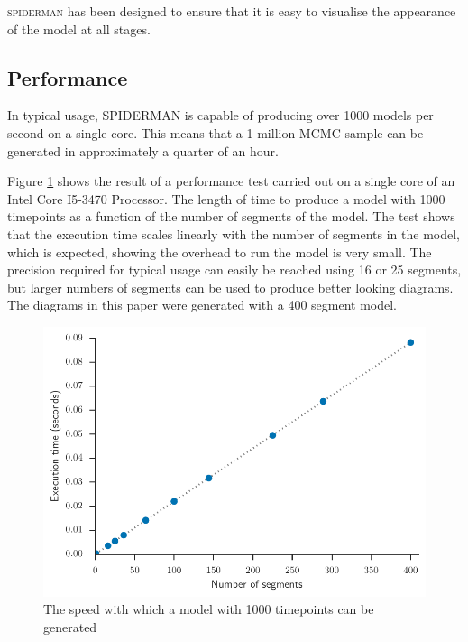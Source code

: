 \documentclass[a4paper,fleqn,usenatbib]{mnras}
\begin{document}
\textsc{spiderman} has been designed to ensure that it is easy to visualise the appearance of the model at all stages.

\subsection{Performance}\label{sec:performance}

In typical usage, SPIDERMAN is capable of producing over 1000 models per second on a single core. This means that a 1 million MCMC sample can be generated in approximately a quarter of an hour.

Figure \ref{fig:exec_time} shows the result of a performance test carried out on a single core of an Intel Core I5-3470 Processor. The length of time to produce a model with 1000 timepoints as a function of the number of segments of the model. The test shows that the execution time scales linearly with the number of segments in the model, which is expected, showing the overhead to run the model is very small. The precision required for typical usage can easily be reached using 16 or 25 segments, but larger numbers of segments can be used to produce better looking diagrams. The diagrams in this paper were generated with a 400 segment model.

\begin{figure}
\begin{center}
\includegraphics[width=\columnwidth]{img/exec_time.pdf}
\caption{The speed with which a model with 1000 timepoints can be generated}
\label{fig:exec_time}
\end{center}
\end{figure}
\end{document}
